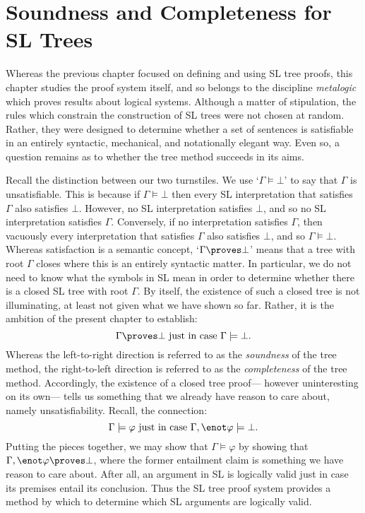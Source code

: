 \chapter{Soundness and Completeness for SL Trees}
\label{ch.SLsoundcomplete}

Whereas the previous chapter focused on defining and using SL tree proofs, this chapter studies the proof system itself, and so belongs to the discipline \emph{metalogic} which proves results about logical systems.
Although a matter of stipulation, the rules which constrain the construction of SL trees were not chosen at random.
Rather, they were designed to determine whether a set of sentences is satisfiable in an entirely syntactic, mechanical, and notationally elegant way.
Even so, a question remains as to whether the tree method succeeds in its aims.

Recall the distinction between our two turnstiles.
We use `$\Gamma \models \bot$' to say that $\Gamma$ is unsatisfiable.
This is because if $\Gamma \models \bot$ then every SL interpretation that satisfies $\Gamma$ also satisfies $\bot$.
However, no SL interpretation satisfies $\bot$, and so no SL interpretation satisfies $\Gamma$.
Conversely, if no interpretation satisfies $\Gamma$, then vacuously every interpretation that satisfies $\Gamma$ also satisfies $\bot$, and so $\Gamma \models \bot$.
Whereas satisfaction is a semantic concept, `$\Gamma \proves \bot$' means that a tree with root $\Gamma$ closes where this is an entirely syntactic matter.
In particular, we do not need to know what the symbols in SL mean in order to determine whether there is a closed SL tree with root $\Gamma$.
By itself, the existence of such a closed tree is not illuminating, at least not given what we have shown so far.
Rather, it is the ambition of the present chapter to establish:
  $$\Gamma \proves \bot \text{ just in case } \Gamma \models \bot.$$
Whereas the left-to-right direction is referred to as the \textit{soundness} of the tree method, the right-to-left direction is referred to as the \textit{completeness} of the tree method.
Accordingly, the existence of a closed tree proof--- however uninteresting on its own--- tells us something that we already have reason to care about, namely unsatisfiability.
Recall, the connection: %
    $$\Gamma \models \varphi \text{ just in case } \Gamma, \enot \varphi \models \bot.$$
Putting the pieces together, we may show that $\Gamma \models \varphi$ by showing that $\Gamma, \enot \varphi \proves \bot$, where the former entailment claim is something we have reason to care about.
After all, an argument in SL is logically valid just in case its premises entail its conclusion.
Thus the SL tree proof system provides a method by which to determine which SL arguments are logically valid.





